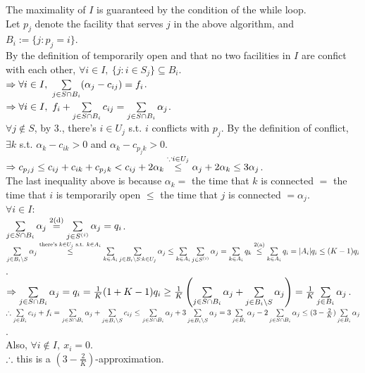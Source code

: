 \begin{pr}
\begin{enumerate}
\end{enumerate}
The maximality of $I$ is guaranteed by the condition of the while loop.\\
Let $p_j$ denote the facility that serves $j$ in the above algorithm, and $B_i:=\{j:p_j=i\}$.\\
By the definition of temporarily open and that no two facilities in $I$ are confict with each other, $\forall i\in I,\ \{j:i\in S_j\}\subseteq B_i$.\\
$\Rightarrow\forall i\in I,\ \sum\limits_{j\in S\cap B_i}(\alpha_j-c_{ij})=f_i$.\\
$\Rightarrow\forall i\in I,\ f_i+\sum\limits_{j\in S\cap B_i}c_{ij}=\sum\limits_{j\in S\cap B_i}\alpha_j$.\\
$\forall j\notin S$, by 3., there's $i\in U_j$ s.t. $i$ conflicts with $p_j$. By the definition of conflict, $\exists k$ s.t. $\alpha_k-c_{ik}>0$ and $\alpha_k-c_{p_jk}>0$.\\
$\Rightarrow c_{p_jj}\leq c_{ij}+c_{ik}+c_{p_jk}<c_{ij}+2\alpha_k\overset{\because i\in U_j}\leq\alpha_j+2\alpha_k\leq3\alpha_j$.\\
The last inequality above is because $\alpha_k=$ the time that $k$ is connected $=$ the time that $i$ is temporarily open $\leq$ the time that $j$ is connected $=\alpha_j$.\\
$\forall i\in I$:\\
$\sum\limits_{j\in S\cap B_i}\alpha_j\overset{\text{2(d)}}=\sum\limits_{j\in S^{(i)}}\alpha_j=q_i$.\\
$\sum\limits_{j\in B_i\setminus S}\alpha_j\overset{\text{there's }k\in U_j\text{ s.t. }k\in A_i}\leq\sum\limits_{k\in A_i}\sum\limits_{j\in B_i\setminus S:k\in U_j}\alpha_j\leq\sum\limits_{k\in A_i}\sum\limits_{j\in S^{(i)}}\alpha_j=\sum\limits_{k\in A_i}q_k\overset{\text{2(a)}}\leq\sum\limits_{k\in A_i}q_i=|A_i|q_i\leq(K-1)q_i$.\\
$\Rightarrow\sum\limits_{j\in S\cap B_i}\alpha_j=q_i=\frac1K(1+K-1)q_i\geq\frac1K\left(\sum\limits_{j\in S\cap B_i}\alpha_j+\sum\limits_{j\in B_i\setminus S}\alpha_j\right)=\frac1K\sum\limits_{j\in B_i}\alpha_j$.\\
$\therefore\sum\limits_{j\in B_i}c_{ij}+f_i=\sum\limits_{j\in S\cap B_i}\alpha_j+\sum\limits_{j\in B_i\setminus S}c_{ij}\leq\sum\limits_{j\in S\cap B_i}\alpha_j+3\sum\limits_{j\in B_i\setminus S}\alpha_j=3\sum\limits_{j\in B_i}\alpha_j-2\sum\limits_{j\in S\cap B_i}\alpha_j\leq(3-\frac2K)\sum\limits_{j\in B_i}\alpha_j$.\\
Also, $\forall i\notin I,\ x_i=0$.\\
$\therefore$ this is a $(3-\frac2K)$-approximation.
\end{pr}
